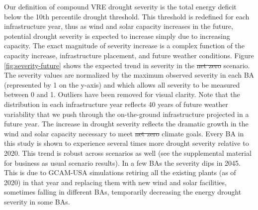 \documentclass{agujournal2019}
\providecommand{\DIFadd}[1]{{\protect\color{blue}\uwave{#1}}} %
\providecommand{\DIFdel}[1]{{\protect\color{red}\sout{#1}}} %
\providecommand{\DIFaddbegin}{} %
\providecommand{\DIFaddend}{} %
\providecommand{\DIFdelbegin}{} %
\providecommand{\DIFdelend}{} %
\begin{document}
Our definition of compound VRE drought severity is the total energy deficit below the 10th percentile drought threshold. This threshold is redefined for each infrastructure year, thus as wind and solar capacity increases in the future, potential drought severity is expected to increase simply due to increasing capacity. The exact magnitude of severity increase is a complex function of the capacity increase, infrastructure placement, and future weather conditions. Figure \ref{fig:severity-future} shows the expected trend in severity in the \DIFdelbegin \DIFdel{net zero }\DIFdelend \DIFaddbegin \DIFadd{high renewable }\DIFaddend scenario. The severity values are normalized by the maximum observed severity in each BA (represented by 1 on the y-axis) and which allows all severity to be measured between 0 and 1. Outliers have been removed for visual clarity. Note that the distribution in each infrastructure year reflects 40 years of future weather variability that we push through the on-the-ground infrastructure projected in a future year. The increase in drought severity reflects the dramatic growth in the wind and solar capacity necessary to meet \DIFdelbegin \DIFdel{net zero }\DIFdelend \DIFaddbegin \DIFadd{high renewable }\DIFaddend climate goals. Every BA in this study is shown to experience several times more drought severity relative to 2020. This trend is robust across scenarios as well (see the supplemental material for business as usual scenario results). In a few BAs the severity dips in 2045. This is due to GCAM-USA simulations retiring all the existing plants (as of 2020) in that year and replacing them with new wind and solar facilities, sometimes falling in different BAs, temporarily decreasing the energy drought severity in some BAs. 

\end{document}
